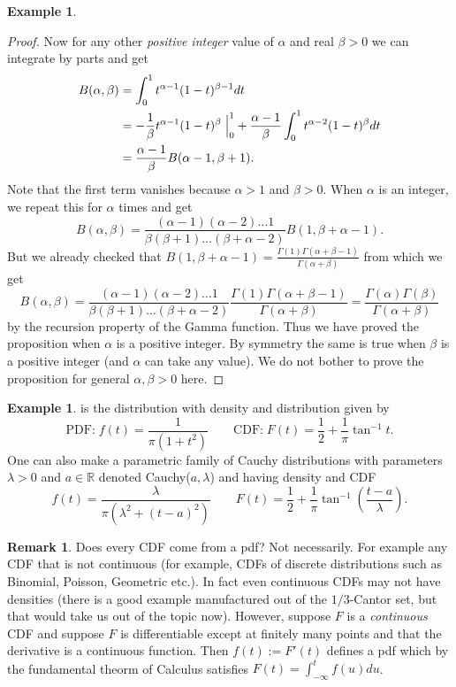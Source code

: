 \documentclass[preprint,  11pt]{amsart}
\newcommand{\para}[1]{\vspace{4mm}\noindent{\bfseries #1:}}
\theoremstyle{plain} %
\theoremstyle{definition} %
\newtheorem{remark}[theorem]{Remark}
\newtheorem{example}[theorem]{Example}
\begin{document}
\begin{example}
\begin{proof}
Now for any other {\em positive integer} value of $\alpha$ and real $\beta>0$ we can integrate by parts and get
\begin{align*}
B(\alpha,\beta)&=\int_{0}^{1}t^{\alpha-1}(1-t)^{\beta-1}dt \\
&= -\frac{1}{\beta}t^{\alpha-1}(1-t)^{\beta}\left.\vphantom{\hbox{\Large (}}\right|_{0}^{1} + \frac{\alpha-1}{\beta}\int_{0}^{1}t^{\alpha-2}(1-t)^{\beta}dt \\
&= \frac{\alpha-1}{\beta}B(\alpha-1,\beta+1).
\end{align*}
Note that the first term vanishes because $\alpha> 1$ and $\beta>0$. When $\alpha$ is an integer, we repeat this for $\alpha$ times and get
$$
B(\alpha,\beta)=\frac{(\alpha-1)(\alpha-2)\ldots 1}{\beta(\beta+1)\ldots (\beta+\alpha-2)}B(1,\beta+\alpha-1).
$$
But we already checked that $B(1,\beta+\alpha-1)=\frac{\Gamma(1)\Gamma(\alpha+\beta-1)}{\Gamma(\alpha+\beta)}$ from which we get
$$
B(\alpha,\beta) = \frac{(\alpha-1)(\alpha-2)\ldots 1}{\beta(\beta+1)\ldots (\beta+\alpha-2)}\frac{\Gamma(1)\Gamma(\alpha+\beta-1)}{\Gamma(\alpha+\beta)} =\frac{\Gamma(\alpha)\Gamma(\beta)}{\Gamma(\alpha+\beta)}
$$
by the recursion property of the Gamma function. Thus we have proved the proposition when $\alpha$ is a positive integer. By symmetry the same is true when $\beta$ is a positive integer (and $\alpha$ can take any value). We do not bother to prove the proposition for general $\alpha,\beta>0$ here.
\end{proof}
\end{example}
\begin{example} \para{The standard Cauchy distribution}  is the distribution with density and distribution given by  
$$
\mbox{PDF:}\; f(t) = \frac{1}{\pi(1+t^{2})}\qquad 
\mbox{CDF:}\; F(t) = \frac{1}{2}+\frac{1}{\pi}\tan^{-1}t.
$$
One can also make a parametric family of Cauchy distributions with parameters $\lambda>0$ and $a\in \mathbb{R}$ denoted Cauchy($a,\lambda$) and having density and CDF
$$
f(t)=\frac{\lambda}{\pi(\lambda^{2}+(t-a)^{2})}\qquad F(t)=\frac{1}{2}+\frac{1}{\pi}\tan^{-1}\left(\frac{t-a}{\lambda}\right).
$$
\end{example}

\begin{remark} Does every CDF come from a pdf? Not necessarily. For example any CDF that is not continuous (for example, CDFs of discrete distributions such as Binomial, Poisson, Geometric etc.). In fact even continuous CDFs may not have densities (there is a good example manufactured out of the $1/3$-Cantor set, but that would take us out of the topic now). However, suppose $F$ is a {\em continuous} CDF and suppose $F$ is differentiable except at finitely many points and that the derivative is a continuous function. Then $f(t):=F'(t)$ defines a pdf which by the fundamental theorm of Calculus satisfies $F(t)=\int_{-\infty}^{t}f(u)du$. 
\end{remark}
\end{document}

